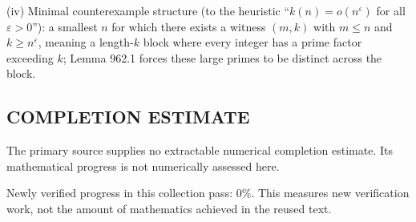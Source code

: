 (iv) Minimal counterexample structure (to the heuristic “$k(n)=o(n^\varepsilon)$ for all $\varepsilon>0$”): a smallest $n$ for which there exists a witness $(m,k)$ with $m\le n$ and $k\ge n^\varepsilon$, meaning a length-$k$ block where every integer has a prime factor exceeding $k$; Lemma 962.1 forces these large primes to be distinct across the block.




\subsection*{COMPLETION ESTIMATE}
The primary source supplies no extractable numerical completion estimate. Its mathematical progress is not numerically assessed here.

Newly verified progress in this collection pass: $0\%$. This measures new verification work, not the amount of mathematics achieved in the reused text.
